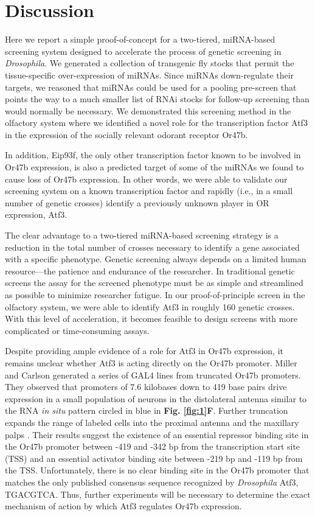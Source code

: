 \section*{Discussion}

Here we report a simple proof-of-concept for a two-tiered, miRNA-based screening system designed to accelerate the process of genetic screening in \emph{Drosophila}.
We generated a collection of transgenic fly stocks that permit the tissue-specific over-expression of miRNAs.
Since miRNAs down-regulate their targets, we reasoned that miRNAs could be used for a pooling pre-screen that points the way to a much smaller list of RNAi stocks for follow-up screening than would normally be necessary.
We demonstrated this screening method in the olfactory system where we identified a novel role for the transcription factor Atf3 in the expression of the socially relevant odorant receptor Or47b.

In addition, Eip93f, the only other transcription factor known to be involved in Or47b expression, is also a predicted target of some of the miRNAs we found to cause loss of Or47b expression.
In other words, we were able to validate our screening system on a known transcription factor and rapidly (i.e., in a small number of genetic crosses) identify a previously unknown player in OR expression, Atf3.

The clear advantage to a two-tiered miRNA-based screening strategy is a reduction in the total number of crosses necessary to identify a gene associated with a specific phenotype.
Genetic screening always depends on a limited human resource---the patience and endurance of the researcher.
In traditional genetic screens the assay for the screened phenotype must be as simple and streamlined as possible to minimize researcher fatigue.
In our proof-of-principle screen in the olfactory system, we were able to identify Atf3 in roughly 160 genetic crosses.
With this level of acceleration, it becomes feasible to design screens with more complicated or time-consuming assays.

Despite providing ample evidence of a role for Atf3 in Or47b expression, it remains unclear whether Atf3 is acting directly on the Or47b promoter.
Miller and Carlson generated a series of GAL4 lines from truncated Or47b promoters.
They observed that promoters of 7.6 kilobases down to 419 base pairs drive expression in a small population of neurons in the distolateral antenna similar to the RNA \emph{in situ} pattern circled in blue in \textbf{Fig. \ref{fig:1}F}.
Further truncation expands the range of labeled cells into the proximal antenna and the maxillary palps \cite{Miller_Carlson_2010}.
Their results suggest the existence of an essential repressor binding site in the Or47b promoter between -419 and -342 bp from the transcription start site (TSS) and an essential activator binding site between -219 bp and -119 bp from the TSS.
Unfortunately, there is no clear binding site in the Or47b promoter that matches the only published \cite{a_Bohmann_Jindra_Uhlirova_2009} consensus sequence recognized by \emph{Drosophila} Atf3, TGACGTCA.
Thus, further experiments will be necessary to determine the exact mechanism of action by which Atf3 regulates Or47b expression.

